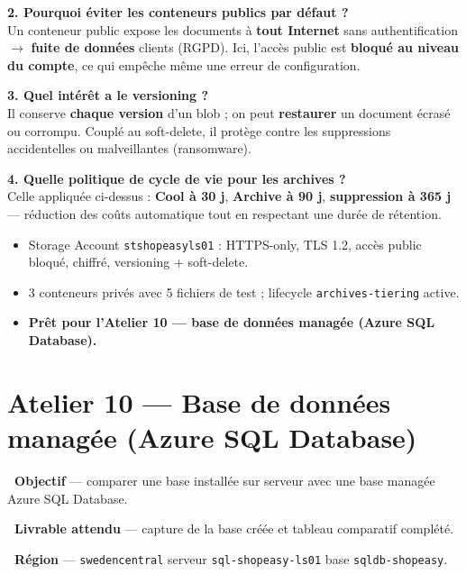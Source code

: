 \documentclass[11pt,a4paper]{article}
\newcommand{\emo}[1]{\raisebox{-0.14em}{\twemoji{#1}}}
\newcommand{\eTarget}{\emo{1f3af}}
\newcommand{\ePackage}{\emo{1f4e6}}
\newcommand{\eGlobe}{\emo{1f310}}
\newcommand{\arr}{\ensuremath{\rightarrow}}
\newcommand{\code}[1]{\texttt{#1}}
\begin{document}
\textbf{2. Pourquoi éviter les conteneurs publics par défaut ?}\\
Un conteneur public expose les documents à \textbf{tout Internet} sans authentification \arr{} \textbf{fuite de
données} clients (RGPD). Ici, l'accès public est \textbf{bloqué au niveau du compte}, ce qui empêche même une
erreur de configuration.

\textbf{3. Quel intérêt a le versioning ?}\\
Il conserve \textbf{chaque version} d'un blob ; on peut \textbf{restaurer} un document écrasé ou corrompu.
Couplé au soft-delete, il protège contre les suppressions accidentelles ou malveillantes (ransomware).

\textbf{4. Quelle politique de cycle de vie pour les archives ?}\\
Celle appliquée ci-dessus : \textbf{Cool à 30 j}, \textbf{Archive à 90 j}, \textbf{suppression à 365 j} —
réduction des coûts automatique tout en respectant une durée de rétention.

\begin{etatbox}
\begin{itemize}
  \item Storage Account \code{stshopeasyls01} : HTTPS-only, TLS 1.2, accès public bloqué, chiffré, versioning + soft-delete.
  \item 3 conteneurs privés avec 5 fichiers de test ; lifecycle \code{archives-tiering} active.
  \item \textbf{Prêt pour l'Atelier 10 — base de données managée (Azure SQL Database).}
\end{itemize}
\end{etatbox}


\section{Atelier 10 — Base de données managée (Azure SQL Database)}

\begin{fiche}
\textbf{\eTarget~Objectif} — comparer une base installée sur serveur avec une base managée Azure SQL Database.

\textbf{\ePackage~Livrable attendu} — capture de la base créée et tableau comparatif complété.

\textbf{\eGlobe~Région} — \code{swedencentral} \quad\textbullet\quad serveur \code{sql-shopeasy-ls01} \quad\textbullet\quad base \code{sqldb-shopeasy}.
\end{fiche}
\end{document}
